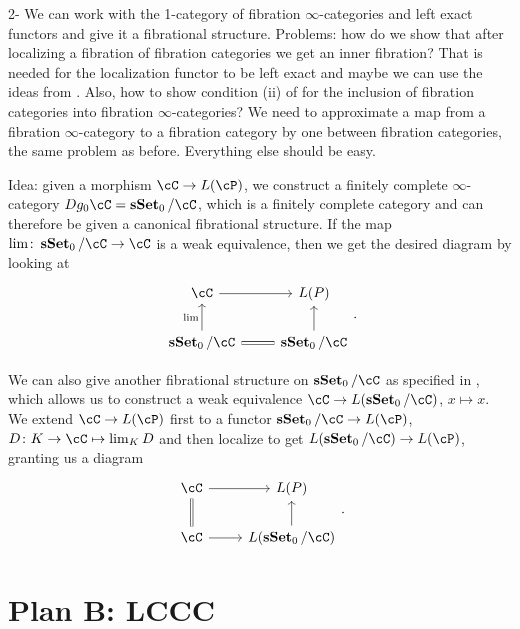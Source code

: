 \documentclass[a4paper,12pt,openany]{scrartcl}
\begin{document}
2- We can work with the 1-category of fibration $\infty$-categories and left
exact functors and give it a fibrational structure. Problems: how do we show
that after localizing a fibration of fibration categories we get an inner
fibration? That is needed for the localization functor to be left exact and
maybe we can use the ideas from \cite[Prop.\ 3.5]{Szu17b}. Also, how to show
condition (ii) of \cite[Thm.\ 7.6.15]{Cis19} for the inclusion of fibration
categories into fibration $\infty$-categories? We need to approximate a map from
a fibration $\infty$-category to a fibration category by one between fibration
categories, the same problem as before. Everything else should be easy.

Idea: given a morphism $\cC\rightarrow L(\cP)$, we construct a finitely complete
$\infty$-category $Dg_0\cC=\sSet_0/\cC$, which is a finitely complete category
and can therefore be given a canonical fibrational structure. If the map
$\lim\colon\sSet_0/\cC\rightarrow\cC$ is a weak equivalence, then we get the
desired diagram by looking at
\[\begin{tikzcd}
	\cC & {L(P)} \\
	{\sSet_0/\cC} & {\sSet_0/\cC}
	\arrow[from=2-2, to=1-2]
	\arrow[from=1-1, to=1-2]
	\arrow["\lim", from=2-1, to=1-1]
	\arrow[Rightarrow, no head, from=2-1, to=2-2]
\end{tikzcd}.\]

We can also give another fibrational structure on
$\sSet_0/\cC$ as specified in \cite[Def.\ 4.1]{Szu17b}, which allows us to
construct a weak equivalence $\cC\rightarrow L(\sSet_0/\cC)$, $x\mapsto x$.
We extend $\cC\rightarrow L(\cP)$ first to a functor $\sSet_0/\cC\rightarrow
L(\cP)$, $D\colon K\rightarrow\cC\mapsto\lim_KD$  and then localize to get $L(\sSet_0/\cC)\rightarrow L(\cP)$, granting us a
diagram
\[\begin{tikzcd}
	\cC & {L(P)} \\
	\cC & {L(\sSet_0/\cC)}
	\arrow[from=2-2, to=1-2]
	\arrow[from=1-1, to=1-2]
	\arrow[Rightarrow, no head, from=2-1, to=1-1]
	\arrow[from=2-1, to=2-2]
\end{tikzcd}.\]

\section{Plan B: LCCC}
\end{document}
